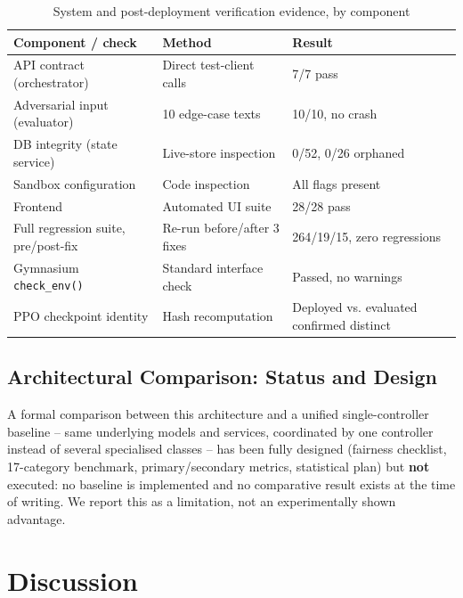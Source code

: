\documentclass[conference]{IEEEtran}
\begin{document}
\begin{table}[t]
\caption{System and post-deployment verification evidence, by component}
\label{tab:verif}
\centering
\begin{tabular}{p{2.3cm}p{2.5cm}p{2.1cm}}
\toprule
Component / check & Method & Result \\
\midrule
API contract (orchestrator) & Direct test-client calls & 7/7 pass \\
Adversarial input (evaluator) & 10 edge-case texts & 10/10, no crash \\
DB integrity (state service) & Live-store inspection & 0/52, 0/26 orphaned \\
Sandbox configuration & Code inspection & All flags present \\
Frontend & Automated UI suite & 28/28 pass \\
Full regression suite, pre/post-fix & Re-run before/after 3 fixes & 264/19/15, zero regressions \\
Gymnasium \texttt{check\_env()} & Standard interface check & Passed, no warnings \\
PPO checkpoint identity & Hash recomputation & Deployed vs. evaluated confirmed distinct \\
\bottomrule
\end{tabular}
\end{table}

\subsection{Architectural Comparison: Status and Design}
\label{sec:futurecompare}

A formal comparison between this architecture and a unified single-controller baseline -- same underlying models and services, coordinated by one controller instead of several specialised classes -- has been fully designed (fairness checklist, 17-category benchmark, primary/secondary metrics, statistical plan) but \textbf{not} executed: no baseline is implemented and no comparative result exists at the time of writing. We report this as a limitation, not an experimentally shown advantage.

\section{Discussion}
\end{document}

